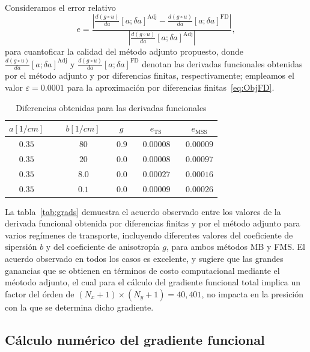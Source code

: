  Consideramos el error relativo
\begin{equation}
 e=\displaystyle \frac{\left|\frac{d (g\circ u)}{da}[a;\delta a]^\mathrm{Adj}- \frac{d (g\circ u)}{da}[a;\delta a]^\mathrm{FD}\right|}{|\frac{d (g\circ u)}{da}[a;\delta a]^\mathrm{Adj}|},
\label{eq:Errgrad}
\end{equation}
para cuantoficar la calidad del método adjunto propuesto, donde
$\frac{d (g\circ u)}{da}[a;\delta a]^\mathrm{Adj}$ y
$\frac{d (g\circ u)}{da}[a;\delta a]^\mathrm{FD}$ denotan 
las derivadas funcionales obtenidas por el método adjunto y por 
diferencias finitas, respectivamente; empleamos el valor $\varepsilon=0.0001$ 
para la aproximación por diferencias finitas~\eqref{eq:ObjFD}.
\begin{table}[h!]
\caption{Diferencias obtenidas para las derivadas funcionales}
\vspace{-0.3cm}
\begin{center}
\begin{tabular}{cccccc}
\hline
$a[1/cm]$ & ~ & $b[1/cm]$ ~ & $g$ ~ & $e_{\text{TS}}$  ~ & $e_{\text{MSS}}$ \\
\hline
$0.35$ & ~ & $80$ ~ &$0.9$ ~ & $0.00008$  ~ & $0.00009$ \\
$0.35$ & ~ & $20$ ~ &$0.0$ ~ & $0.00008$  ~ & $0.00097$ \\
$0.35$ & ~ & $8.0$ ~ &$0.0$ ~ & $0.00027$  ~ & $0.00016$ \\
$0.35$ & ~ & $0.1$ ~ &$0.0$ ~ & $0.00009$  ~ & $0.00026$ \\
\hline
\end{tabular}
\label{tab:grads}
\end{center}
\end{table}
La tabla~\eqref{tab:grads} demuestra el acuerdo observado entre los valores 
de la derivada funcional obtenida por diferencias finitas y por el método adjunto 
para varios regímenes de transporte, incluyendo diferentes valores 
del coeficiente de sipersión $b$ y del coeficiente de anisotropía $g$, 
para ambos métodos MB y FMS. 
El acuerdo observado en todos los casos es excelente, y sugiere que 
las grandes ganancias que se obtienen en términos de costo computacional 
mediante el méotodo adjunto, el cual para el cálculo del gradiente funcional total 
implica un factor del órden de  $(N_x+1) \times (N_y+1) = 40,401$, 
no impacta en la presición con la que se determina dicho gradiente.

\subsection{Cálculo numérico del gradiente funcional}
\label{sec:gradc}
 
